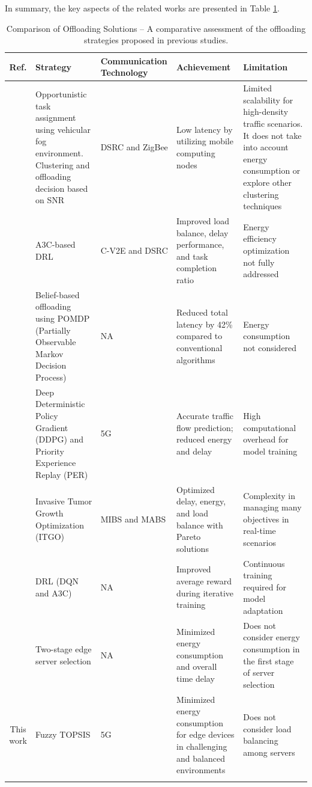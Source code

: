 \documentclass[iicol]{sn-jnl}
\begin{document}
In summary, the key aspects of the related works are presented in Table \ref{tab:comparison_offloading}.

\newlength{\coluna}
\setlength{\coluna}{\dimexpr\textwidth/5\relax} 

\begin{table}[!ht]
    \renewcommand{\arraystretch}{1.3}
    \setlength{\tabcolsep}{2.5pt}    
    \scriptsize
    \centering
    \caption{Comparison of Offloading Solutions – A comparative assessment of the offloading strategies proposed in previous studies.
    }
    \begin{tabular}{cp{\coluna}p{\coluna}p{\coluna}p{\coluna}}
        \toprule
        \bfseries Ref. & \bfseries Strategy & \bfseries Communication Technology & \bfseries Achievement & \bfseries Limitation \\
        \midrule
        \cite{sarieddine2022opportunistic} & Opportunistic task assignment using vehicular fog environment. Clustering and offloading decision based on SNR & DSRC and ZigBee & Low latency by utilizing mobile computing nodes & Limited scalability for high-density traffic scenarios. It does not take into account energy consumption or explore other clustering techniques \\ 
        \cite{lu2023a3c} & A3C-based DRL & C-V2E and DSRC & Improved load balance, delay performance, and task completion ratio & Energy efficiency optimization not fully addressed \\ 
        \cite{ko2023belief} & Belief-based offloading using POMDP (Partially Observable Markov Decision Process) & NA & Reduced total latency by 42\% compared to conventional algorithms & Energy consumption not considered \\ 
        \cite{xu2022computation} & Deep Deterministic Policy Gradient (DDPG) and Priority Experience Replay (PER) & 5G & Accurate traffic flow prediction; reduced energy and delay & High computational overhead for model training \\ 
        \cite{wu2024efficient} & Invasive Tumor Growth Optimization (ITGO) & MIBS and MABS & Optimized delay, energy, and load balance with Pareto solutions & Complexity in managing many objectives in real-time scenarios \\ 
        \cite{sharma2024intelligent} & DRL (DQN and A3C) & NA & Improved average reward during iterative training & Continuous training required for model adaptation \\
        \cite{sharma2024edge} & Two-stage edge server selection & NA & Minimized energy consumption and overall time delay & Does not consider energy consumption in the first stage of server selection \\
        This work & Fuzzy TOPSIS & 5G & Minimized energy consumption for edge devices in challenging and balanced environments & Does not consider load balancing among servers \\        
        \botrule
    \end{tabular}
    \label{tab:comparison_offloading}
\end{table}
\end{document}
